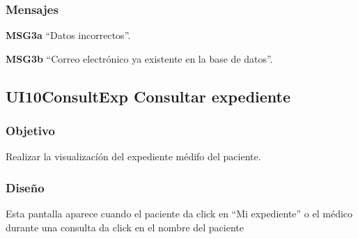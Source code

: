 \subsubsection{Mensajes}
    \begin{Citemize}
        \item {\bf MSG3a} “Datos incorrectos”.
        \item {\bf MSG3b} “Correo electrónico ya existente en la base de datos”.
    \end{Citemize}




\subsection{UI10ConsultExp Consultar expediente}

\subsubsection{Objetivo}
    Realizar la visualizacíón del expediente médifo del paciente. 

\subsubsection{Diseño}
   Esta pantalla aparece cuando el paciente da click en ``Mi expediente'' o el médico durante una consulta da click 
   en el nombre del paciente 

